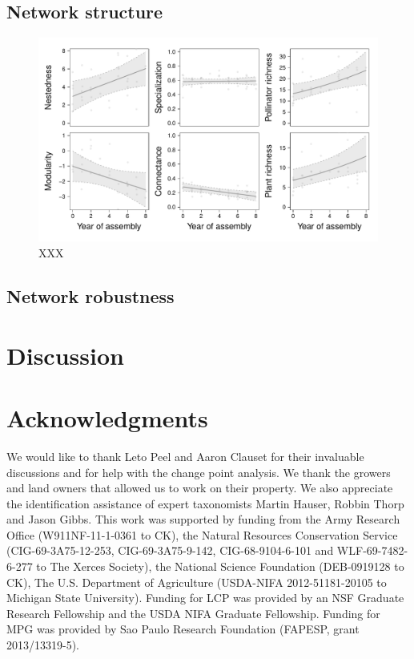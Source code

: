 \documentclass[12pt]{article}
\begin{document}
\subsection*{Network structure}

\begin{figure}
  \centering
  \includegraphics[width=.4\textwidth]{../analysis/networkLevel/figures/baci.pdf}
  \caption{XXX}
  \label{fig:baci}
\end{figure}
\clearpage

\subsection*{Network robustness}


\section*{Discussion}
\label{sec:discussion}

\section*{Acknowledgments}
\label{sec:acknowledge}

We would like to thank Leto Peel and Aaron Clauset for their
invaluable discussions and for help with the change point analysis.
We thank the growers and land owners that allowed us to work on their
property.  We also appreciate the identification assistance of expert
taxonomists Martin Hauser, Robbin Thorp and Jason Gibbs.  This work
was supported by funding from the Army Research Office
(W911NF-11-1-0361 to CK), the Natural Resources Conservation Service
(CIG-69-3A75-12-253, CIG-69-3A75-9-142, CIG-68-9104-6-101 and
WLF-69-7482-6-277 to The Xerces Society), the National Science
Foundation (DEB-0919128 to CK), The U.S.  Department of Agriculture
(USDA-NIFA 2012-51181-20105 to Michigan State University).  Funding
for LCP was provided by an NSF Graduate Research Fellowship and the
USDA NIFA Graduate Fellowship. Funding for MPG was provided by Sao Paulo Research Foundation (FAPESP, grant 2013/13319-5).




\end{document}

